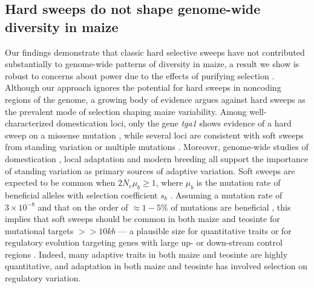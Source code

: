 \documentclass[12pt,a4paper]{article}
\begin{document}
\subsection*{Hard sweeps do not shape genome-wide diversity in maize} %
Our findings demonstrate that classic hard selective sweeps have not contributed substantially to genome-wide patterns of diversity in maize, a result we show is robust to concerns about power due to the effects of purifying selection  \cite{enard2014}. 
Although our approach ignores the potential for hard sweeps in noncoding regions of the genome, a growing body of evidence argues against hard sweeps as the prevalent mode of selection shaping maize variability. 
Among well-characterized domestication loci, only the gene \emph{tga1} shows evidence of a hard sweep on a missense mutation \cite{wang2015}, while several loci are consistent with soft sweeps from standing variation \cite{studer2011,gallavotti2004role} or multiple mutations \cite{wills2013}. 
Moreover, genome-wide studies of domestication \cite{hufford2012},  local adaptation \cite{Takuno15062015} and modern breeding \cite{van2012historical, beissinger2014} all support the importance of standing variation as primary sources of adaptive variation. 
Soft sweeps are expected to be common when $2N_e\mu_b \ge 1$, where $\mu_b$ is the mutation rate of beneficial alleles with selection coefficient $s_b$ \cite{messer2013}. Assuming a mutation rate of $3 \times 10^{-8}$ \cite{clark2005} and that on the order of $\approx 1-5\%$ of mutations are beneficial \cite{eyre2007}, this implies that soft sweeps should be common in both maize and teosinte for mutational targets $>>10kb$ --- a plausible size for quantitative traits or for regulatory evolution targeting genes with large up- or down-stream control regions \cite[e.g.]{studer2011}.
Indeed, many adaptive traits in both maize \cite{wallace2014} and teosinte \cite{weber2008} are highly quantitative,  and adaptation in both maize \cite{hufford2012} and teosinte \cite{pyhajarvi2013} has involved selection on regulatory variation.
\end{document}
